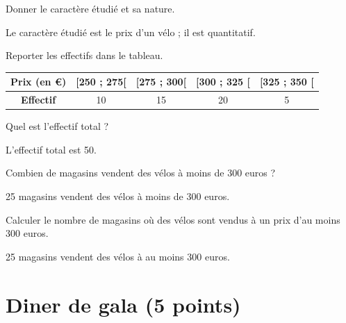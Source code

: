 \documentclass[a4paper,11pt]{exam}
\begin{document}
	\begin{questions} %
		
		\question[1] Donner le caractère étudié et sa nature.
		\begin{solution}
			Le caractère étudié est le prix d'un vélo ; il est quantitatif.
		\end{solution}
		
		\question[1] Reporter les effectifs dans le tableau.
		\begin{solution}
			
				\begin{tabular}{|@{\ }c@{\ }|@{\ }c@{\ }|@{\ }c@{\ }|@{\ }c@{\ }|@{\ }c@{\ }|}
					\hline
					\textbf{Prix} (en €) & [250 ; 275[ & [275 ; 300[ & [300 ; 325 [  & [325 ; 350 [\\
					\hline
					\textbf{Effectif} & 10 & 15  & 20 &  5\\
					\hline 
				\end{tabular}
			
		\end{solution}
		
		\question[1] Quel est l'effectif total ?
		\begin{solution}
			L'effectif total est 50.
		\end{solution}
		
		\question[2] Combien de magasins vendent des vélos à moins de 300 euros ?
		\begin{solution}
			25 magasins vendent des vélos à moins de 300 euros.
		\end{solution}
		
		\question[2] Calculer le nombre de magasins où des vélos sont vendus à un prix d'au moins 300 euros.
		\begin{solution}
			25 magasins vendent des vélos à au moins 300 euros.
		\end{solution}
	\end{questions}

\newpage

\section{Diner de gala (5 points)}
\end{document}
